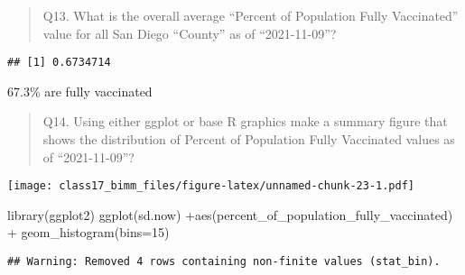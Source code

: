 \documentclass[
]{article}
\newenvironment{Shaded}{\begin{snugshade}}{\end{snugshade}}
\newcommand{\AttributeTok}[1]{\textcolor[rgb]{0.77,0.63,0.00}{#1}}
\newcommand{\ConstantTok}[1]{\textcolor[rgb]{0.00,0.00,0.00}{#1}}
\newcommand{\DecValTok}[1]{\textcolor[rgb]{0.00,0.00,0.81}{#1}}
\newcommand{\FunctionTok}[1]{\textcolor[rgb]{0.00,0.00,0.00}{#1}}
\newcommand{\NormalTok}[1]{#1}
\newcommand{\OtherTok}[1]{\textcolor[rgb]{0.56,0.35,0.01}{#1}}
\newcommand{\SpecialCharTok}[1]{\textcolor[rgb]{0.00,0.00,0.00}{#1}}
\newcommand{\StringTok}[1]{\textcolor[rgb]{0.31,0.60,0.02}{#1}}
\begin{document}
\begin{quote}
Q13. What is the overall average ``Percent of Population Fully
Vaccinated'' value for all San Diego ``County'' as of ``2021-11-09''?
\end{quote}

\begin{Shaded}
\end{Shaded}

\begin{verbatim}
## [1] 0.6734714
\end{verbatim}

67.3\% are fully vaccinated

\begin{quote}
Q14. Using either ggplot or base R graphics make a summary figure that
shows the distribution of Percent of Population Fully Vaccinated values
as of ``2021-11-09''?
\end{quote}

\begin{Shaded}
\end{Shaded}

\texttt{[image: class17\_bimm\_files/figure-latex/unnamed-chunk-23-1.pdf]}

\begin{Shaded}
\begin{Highlighting}[]
\FunctionTok{library}\NormalTok{(ggplot2)}
\FunctionTok{ggplot}\NormalTok{(sd.now) }\SpecialCharTok{+}\FunctionTok{aes}\NormalTok{(percent\_of\_population\_fully\_vaccinated) }\SpecialCharTok{+} \FunctionTok{geom\_histogram}\NormalTok{(}\AttributeTok{bins=}\DecValTok{15}\NormalTok{)}
\end{Highlighting}
\end{Shaded}

\begin{verbatim}
## Warning: Removed 4 rows containing non-finite values (stat_bin).
\end{verbatim}
\end{document}
